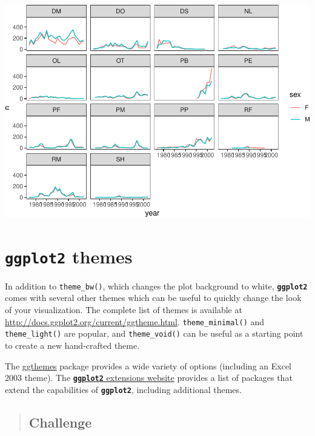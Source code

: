 \documentclass[]{book}
\begin{document}
\includegraphics{img/R-ecology-facet-by-species-and-sex-white-bg-1.pdf}

\section{\texorpdfstring{\textbf{\texttt{ggplot2}}
themes}{ggplot2 themes}}\label{ggplot2-themes}

In addition to \texttt{theme\_bw()}, which changes the plot background
to white, \textbf{\texttt{ggplot2}} comes with several other themes
which can be useful to quickly change the look of your visualization.
The complete list of themes is available at
\url{http://docs.ggplot2.org/current/ggtheme.html}.
\texttt{theme\_minimal()} and \texttt{theme\_light()} are popular, and
\texttt{theme\_void()} can be useful as a starting point to create a new
hand-crafted theme.

The
\href{https://jrnold.github.io/ggthemes/reference/index.html}{ggthemes}
package provides a wide variety of options (including an Excel 2003
theme). The
\href{https://www.ggplot2-exts.org}{\textbf{\texttt{ggplot2}} extensions
website} provides a list of packages that extend the capabilities of
\textbf{\texttt{ggplot2}}, including additional themes.

\begin{quote}
\subsection{Challenge}\label{challenge-9}
\end{quote}
\end{document}
